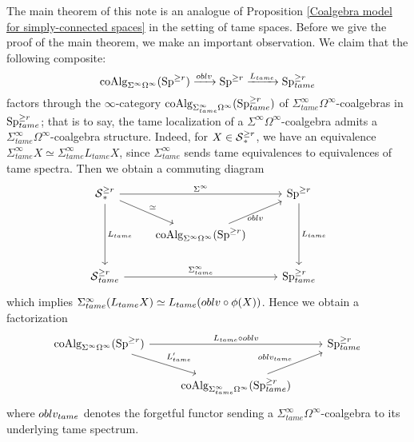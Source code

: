 The main theorem of this note is an analogue of Proposition \ref{Coalgebra model for simply-connected spaces} in the setting of tame spaces.
Before we give the proof of the main theorem, we make an important observation.
We claim that the following composite:
\[
\operatorname{coAlg}_{\Sigma^{\infty}\Omega^{\infty}}(\operatorname{Sp}^{\geq r})
\xrightarrow{oblv}
\operatorname{Sp}^{\geq r}
\xrightarrow{L_{tame}}
\operatorname{Sp}^{\geq r}_{tame}
\]
factors through the $\infty$-category $\operatorname{coAlg}_{\Sigma^{\infty}_{tame}\Omega^{\infty}}(\operatorname{Sp}^{\geq r}_{tame})$ of $\Sigma^{\infty}_{tame}\Omega^{\infty}$-coalgebras in $\operatorname{Sp}^{\geq r}_{tame}$;
that is to say, the tame localization of a $\Sigma^{\infty}\Omega^\infty$-coalgebra admits a $\Sigma^{\infty}_{tame}\Omega^{\infty}$-coalgebra structure.
Indeed, 
for $X\in \operatorname{\mathcal{S}}_*^{\geq r}$, we have an equivalence $\Sigma^{\infty}_{tame}X \simeq \Sigma^{\infty}_{tame}L_{tame}X$, since $\Sigma^{\infty}_{tame}$ sends tame equivalences to equivalences of tame spectra. Then we obtain a commuting diagram
\[
\begin{tikzcd}
\Space^{\geq r}_{*} & & \Sp^{\geq r}\\
& \coAlg_{\Sigma^{\infty}\Omega^{\infty}}(\Sp^{\geq r})&\\
\Space^{\geq r}_{tame}&  & \Sp^{\geq r}_{tame}
\arrow[from=1-1,to=1-3, "\Sigma^{\infty}"]
\arrow[from=1-1,to=2-2, "\simeq"]
\arrow[from=2-2,to=1-3, "\oblv" below]
\arrow[from=1-1, to=3-1, "L_{tame}"]
\arrow[from=1-3, to=3-3, "L_{tame}"]
\arrow[from=3-1, to=3-3, "\Sigma_{tame}^{\infty}"]
\end{tikzcd}
\]
which implies $\Sigma^{\infty}_{tame}(L_{tame}X)\simeq  L_{tame}(oblv\circ\phi(X))$. 
Hence we obtain a factorization
\[
\begin{tikzcd}
	\coAlg_{\Sigma^{\infty}\Omega^{\infty}}(\Sp^{\geq r}) &  & \Sp^{\geq r}_{tame}\\
	 & \coAlg_{\Sigma^{\infty}_{tame}\Omega^{\infty}}(\Sp_{tame}^{\geq r}) &
	 \arrow[from=1-1, to=1-3, "L_{tame}\circ \oblv"]
	 \arrow[from=1-1, to=2-2, "L'_{tame}"]
	 \arrow[from=2-2, to=1-3, "\oblv_{tame}"]	 
\end{tikzcd}
\]
where $oblv_{tame}$ denotes the forgetful functor sending a $\Sigma^{\infty}_{tame}\Omega^{\infty}$-coalgebra to its underlying tame spectrum. 

